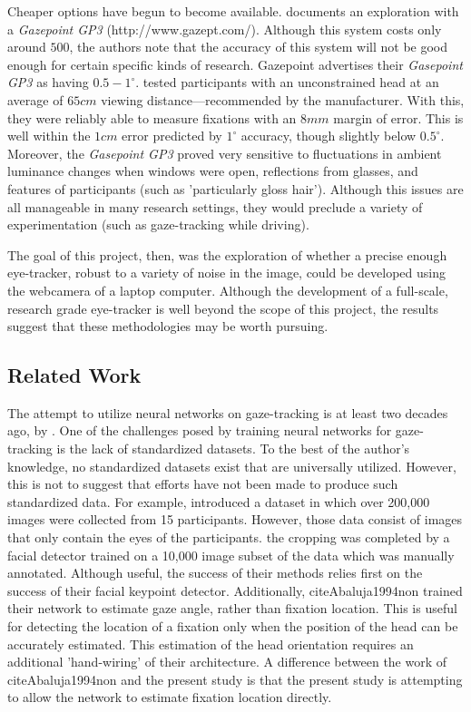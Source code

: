 \documentclass[10pt,letterpaper]{article}
\begin{document}
Cheaper options have begun to become available.  documents an exploration with a \emph{Gazepoint GP3} (http://www.gazept.com/). Although this system costs only around \textdollar$500$, the authors note that the accuracy of this system will not be good enough for certain specific kinds of research. Gazepoint advertises their \emph{Gasepoint GP3} as having $0.5-1^{\circ}$.  tested participants with an unconstrained head at an average of $65cm$ viewing distance---recommended by the manufacturer. With this, they were reliably able to measure fixations with an $8mm$ margin of error. This is well within the $1cm$ error predicted by $1^{\circ}$ accuracy, though slightly below $0.5^{\circ}$. Moreover, the \emph{Gasepoint GP3} proved very sensitive to fluctuations in ambient luminance changes when windows were open, reflections from glasses, and features of participants (such as 'particularly gloss hair'). Although this issues are all manageable in many research settings, they would preclude a variety of experimentation (such as gaze-tracking while driving).

The goal of this project, then, was the exploration of whether a precise enough eye-tracker, robust to a variety of noise in the image, could be developed using the webcamera of a laptop computer. Although the development of a full-scale, research grade eye-tracker is well beyond the scope of this project, the results suggest that these methodologies may be worth pursuing.  

\subsection{Related Work}

The attempt to utilize neural networks on gaze-tracking is at least two decades ago, by . One of the challenges posed by training neural networks for gaze-tracking is the lack of standardized datasets. To the best of the author's knowledge, no standardized datasets exist that are universally utilized. However, this is not to suggest that efforts have not been made to produce such standardized data. For example,  introduced a dataset in which over 200,000 images were collected from 15 participants. However, those data consist of images that only contain the eyes of the participants. the cropping was completed by a facial detector trained on a 10,000 image subset of the data which was manually annotated. Although useful, the success of their methods relies first on the success of their facial keypoint detector. Additionally, citeA{baluja1994non} trained their network to estimate gaze angle, rather than fixation location. This is useful for detecting the location of a fixation only when the position of the head can be accurately estimated. This estimation of the head orientation requires an additional 'hand-wiring' of their architecture. A difference between the work of citeA{baluja1994non} and the present study is that the present study is attempting to allow the network to estimate fixation location directly. 
\end{document}

